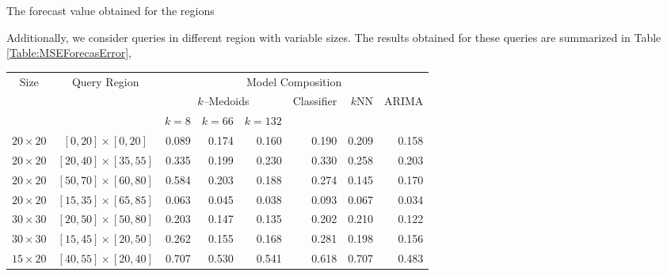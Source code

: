 The forecast value obtained for the regions 


Additionally, we consider queries in different region with variable sizes. The results obtained for these queries are summarized in Table \ref{Table:MSEForecasError}, 

\begin{table}[h]	
    \centering
	\small
	\begin{tabular}{|c|c|r|r|r|r|r|r|}
		\hline
		\multirow{3}{*}{Size} & \multirow{3}{*}{Query Region} & \multicolumn{6}{c|}{Model Composition} \\ 
		\cline{3-8}
		& & \multicolumn{3}{c|}{$k$--Medoids} & \multirow{2}{*}{Classifier} & \multirow{2}{*}{$k$NN} & \multirow{2}{*}{ARIMA} \\ 
		\cline{3-5}
		& & $k =8$ & $k = 66$ & $k = 132$ &  & & \\ \hline %
		$20 \times 20$ & $[ 0, 20] \times [ 0, 20]$ & 0.089 & 0.174 & 0.160 & \cellcolor{red!20}0.190 & 0.209 & 0.158  \\ %
		$20 \times 20$ & $[20, 40] \times [35, 55]$ & 0.335 & 0.199 & 0.230 & \cellcolor{red!20}0.330 & 0.258 & 0.203 \\ %
		$20 \times 20$ & $[50, 70] \times [60, 80]$ & 0.584 & 0.203 & 0.188 & \cellcolor{red!20}0.274 & 0.145 & 0.170 \\ %
		$20 \times 20$ & $[15, 35] \times [65, 85]$ & 0.063 & 0.045 & 0.038 & \cellcolor{red!20}0.093 & 0.067 & 0.034 \\ %
		$30 \times 30$ & $[20, 50] \times [50, 80]$ & 0.203 & 0.147 & 0.135 & \cellcolor{red!20}0.202 & 0.210 & 0.122 \\ %
		$30 \times 30$ & $[15, 45] \times [20, 50]$ & 0.262 & 0.155 & 0.168 & \cellcolor{red!20}0.281 & 0.198 & 0.156 \\ %
		$15 \times 20$ & $[40, 55] \times [20, 40]$ & 0.707 & 0.530 & 0.541 & \cellcolor{red!20}0.618 & 0.707 & 0.483 \\ %

\end{tabular}
\end{table}
